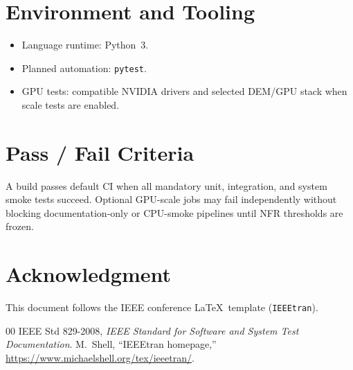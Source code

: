 \documentclass[conference]{IEEEtran}
\begin{document}
\section{Environment and Tooling}
\begin{itemize}
  \item Language runtime: Python~3.
  \item Planned automation: \texttt{pytest}.
  \item GPU tests: compatible NVIDIA drivers and selected DEM/GPU stack when
        scale tests are enabled.
\end{itemize}

\section{Pass / Fail Criteria}
A build passes default CI when all mandatory unit, integration, and system
smoke tests succeed. Optional GPU-scale jobs may fail independently without
blocking documentation-only or CPU-smoke pipelines until NFR thresholds are
frozen.

\section*{Acknowledgment}
This document follows the IEEE conference \LaTeX\ template (\texttt{IEEEtran}).

\begin{thebibliography}{00}
 IEEE Std 829-2008, \emph{IEEE Standard for Software and
System Test Documentation}.
 M.~Shell, ``IEEEtran homepage,''
\url{https://www.michaelshell.org/tex/ieeetran/}.
\end{thebibliography}
\end{document}
